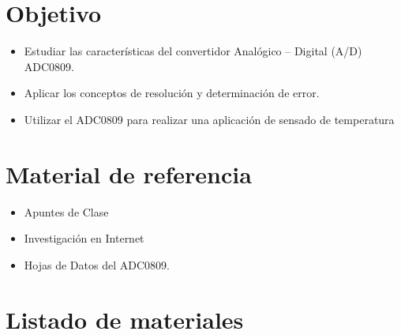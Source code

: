 \documentclass[12pt]{article}
\begin{document}
	\tableofcontents
	\newpage
	
	\section{Objetivo}
	\begin{itemize}
	    \item[\checkmark] Estudiar las características del convertidor Analógico – Digital (A/D) ADC0809.
        \item[\checkmark] Aplicar los conceptos de resolución y determinación de error.
        \item[\checkmark] Utilizar el ADC0809 para realizar una aplicación de sensado de temperatura
	\end{itemize}
	

	\section{Material de referencia}
	\begin{itemize}
	    \item Apuntes de Clase
\item Investigación en Internet
\item Hojas de Datos del ADC0809.
	\end{itemize}
	
		\section{Listado de materiales}
		
\end{document}

